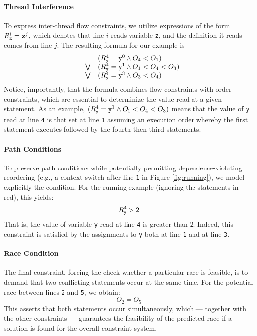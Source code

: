 \paragraph{Thread Interference} To express inter-thread flow constraints, we utilize expressions of the form $R_{\tt z}^i={\tt z}^j$, which denotes that line $i$ reads variable {\tt z}, and the definition it reads comes from line $j$. The resulting formula for our example is
$$
\begin{array}{lcl}
	& & (R_{\tt y}^4={\tt y}^0 \wedge O_4 < O_1)  \\
& \bigvee &
	(R_{\tt y}^4={\tt y}^1 \wedge O_1 < O_4 < O_3) \\
& \bigvee &
	(R_{\tt y}^4={\tt y}^3 \wedge O_3 < O_4)
\end{array}
$$    
Notice, importantly, that the formula combines flow constraints with order constraints, which are essential to determinize the value read at a given statement. As an example, 
$(R_{\tt y}^4={\tt y}^1 \wedge O_1 < O_4 < O_3)$ means that the value of {\tt y} read at 
line {\tt 4} is that set at line {\tt 1} assuming an execution order whereby the first statement executes followed by the fourth then third statements. 

\paragraph{Path Conditions} To preserve path conditions while potentially permitting dependence-violating reordering (e.g., a context switch after line {\tt 1} in Figure \ref{fig:running}), we model explicitly the condition. For the running example (ignoring the statements in red), this yields:
$$
	R_{\tt y}^4 > 2
$$
That is, the value of variable {\tt y} read at line {\tt 4} is greater than $2$. Indeed, this constraint is satisfied by the assignments to {\tt y} both at line {\tt 1} and at line {\tt 3}.

\paragraph{Race Condition} The final constraint, forcing the check whether a particular race is feasible, is to demand that two conflicting statements occur at the same time. For the potential race between lines {\tt 2} and {\tt 5}, we obtain:
$$
	O_2 = O_5
$$ 
This asserts that both statements occur simultaneously, which --- together with the other constraints --- guarantees the feasibility of the predicted race if a solution is found for the overall constraint system.

